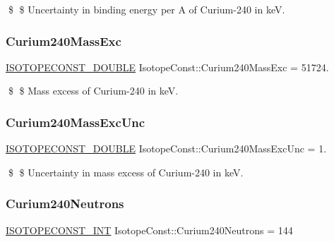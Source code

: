 \$ \$ Uncertainty in binding energy per A of Curium-\/240 in keV. \mbox{\label{group___isotope_const-_curium-_cm240_gac53f3a8880b09e216027a94bba12d414}} 
\subsubsection{\texorpdfstring{Curium240\+Mass\+Exc}{Curium240MassExc}}
{\footnotesize\ttfamily \mbox{\hyperlink{group___isotope_const-_macros_ga8f45a7272ce02c0b4c65c44636ed719a}{I\+S\+O\+T\+O\+P\+E\+C\+O\+N\+S\+T\+\_\+\+D\+O\+U\+B\+LE}} Isotope\+Const\+::\+Curium240\+Mass\+Exc = 51724.}

\$ \$ Mass excess of Curium-\/240 in keV. \mbox{\label{group___isotope_const-_curium-_cm240_gad077a58527dbd455752966efccd63683}} 
\subsubsection{\texorpdfstring{Curium240\+Mass\+Exc\+Unc}{Curium240MassExcUnc}}
{\footnotesize\ttfamily \mbox{\hyperlink{group___isotope_const-_macros_ga8f45a7272ce02c0b4c65c44636ed719a}{I\+S\+O\+T\+O\+P\+E\+C\+O\+N\+S\+T\+\_\+\+D\+O\+U\+B\+LE}} Isotope\+Const\+::\+Curium240\+Mass\+Exc\+Unc = 1.}

\$ \$ Uncertainty in mass excess of Curium-\/240 in keV. \mbox{\label{group___isotope_const-_curium-_cm240_gab68e2bf644df87467f511934ffafdbd8}} 
\subsubsection{\texorpdfstring{Curium240\+Neutrons}{Curium240Neutrons}}
{\footnotesize\ttfamily \mbox{\hyperlink{group___isotope_const-_macros_ga5f18360b3e99483a35c32d789e62621c}{I\+S\+O\+T\+O\+P\+E\+C\+O\+N\+S\+T\+\_\+\+I\+NT}} Isotope\+Const\+::\+Curium240\+Neutrons = 144}

